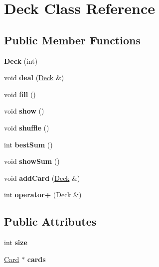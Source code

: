 \hypertarget{class_deck}{}\section{Deck Class Reference}
\label{class_deck}
\subsection*{Public Member Functions}
\begin{DoxyCompactItemize}
\item 
\mbox{\label{class_deck_a5487610d44f13d27ef54c930e2bdadf9}} 
{\bfseries Deck} (int)
\item 
\mbox{\label{class_deck_ad85ed05a8321f9d1f0a2255dd1251473}} 
void {\bfseries deal} (\mbox{\hyperlink{class_deck}{Deck}} \&)
\item 
\mbox{\label{class_deck_a02ae42f8f3aa795bffbb6e7f603be588}} 
void {\bfseries fill} ()
\item 
\mbox{\label{class_deck_adc55458a86a0bc20b5006ddc4ff75f5e}} 
void {\bfseries show} ()
\item 
\mbox{\label{class_deck_ae5a1e52ab00ae5924f2bc6b730dba3eb}} 
void {\bfseries shuffle} ()
\item 
\mbox{\label{class_deck_ae7b88d69f0b9482389d9c6bf93124691}} 
int {\bfseries best\+Sum} ()
\item 
\mbox{\label{class_deck_aff55a8c6dc64c321b9198482e4a35d78}} 
void {\bfseries show\+Sum} ()
\item 
\mbox{\label{class_deck_a1361dd35348612d243dfc111432cd9e7}} 
void {\bfseries add\+Card} (\mbox{\hyperlink{class_deck}{Deck}} \&)
\item 
\mbox{\label{class_deck_a6551c710d28fba3b8f7a097c3c43a046}} 
int {\bfseries operator+} (\mbox{\hyperlink{class_deck}{Deck}} \&)
\end{DoxyCompactItemize}
\subsection*{Public Attributes}
\begin{DoxyCompactItemize}
\item 
\mbox{\label{class_deck_a8a6e5802d07c4e5181f624fbdd67f71f}} 
int {\bfseries size}
\item 
\mbox{\label{class_deck_aa5c2498afeda699034fd5feb50234092}} 
\mbox{\hyperlink{class_card}{Card}} $\ast$ {\bfseries cards}
\end{DoxyCompactItemize}
